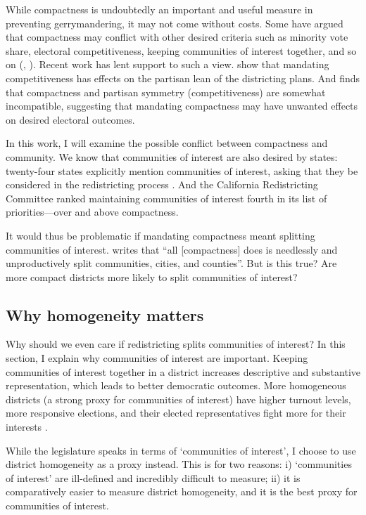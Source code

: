 \documentclass[]{article}
\begin{document}
While compactness is undoubtedly an important and useful measure in
preventing gerrymandering, it may not come without costs. Some have
argued that compactness may conflict with other desired criteria such as
minority vote share, electoral competitiveness, keeping communities of
interest together, and so on (\citep{cain1984}, \cite{karlan1989}).
Recent work has lent support to such a view. \cite{ddj2019comp} show
that mandating competitiveness has effects on the partisan lean of the
districting plans. And \cite{s2020} finds that compactness and partisan
symmetry (competitiveness) are somewhat incompatible, suggesting that
mandating compactness may have unwanted effects on desired electoral
outcomes.

In this work, I will examine the possible conflict between compactness
and community. We know that communities of interest are also desired by
states: twenty-four states explicitly mention communities of interest,
asking that they be considered in the redistricting process
\citep{brennan}. And the California Redistricting Committee ranked
maintaining communities of interest fourth in its list of
priorities---over and above compactness.

It would thus be problematic if mandating compactness meant splitting
communities of interest. \citeauthor{wolf2015} writes that ``all
{[}compactness{]} does is needlessly and unproductively split
communities, cities, and counties''. But is this true? Are more compact
districts more likely to split communities of interest?

\hypertarget{why-homogeneity-matters}{%
\subsection{Why homogeneity matters}\label{why-homogeneity-matters}}

Why should we even care if redistricting splits communities of interest?
In this section, I explain why communities of interest are important.
Keeping communities of interest together in a district increases
descriptive and substantive representation, which leads to better
democratic outcomes. More homogeneous districts (a strong proxy for
communities of interest) have higher turnout levels, more responsive
elections, and their elected representatives fight more for their
interests \citep{ogrady2018}.

While the legislature speaks in terms of `communities of interest', I
choose to use district homogeneity as a proxy instead. This is for two
reasons: i) `communities of interest' are ill-defined and incredibly
difficult to measure; ii) it is comparatively easier to measure district
homogeneity, and it is the best proxy for communities of interest.
\end{document}
